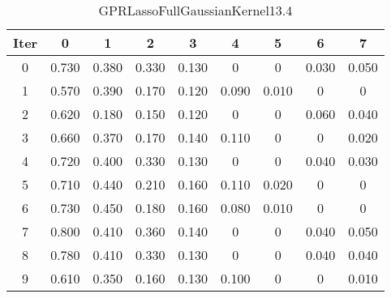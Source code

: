 \begin{table}
	\begin{center}
		\begin{tabular}{|c|c|c|c|c|c|c|c|c|}
			\hline
			Iter & 0 & 1 & 2 & 3 & 4 & 5 & 6 & 7 \\
			\hline
			0 & 0.730 & 0.380 & 0.330 & 0.130 & 0 & 0 & 0.030 & 0.050 \\
			\hline
			1 & 0.570 & 0.390 & 0.170 & 0.120 & 0.090 & 0.010 & 0 & 0 \\
			\hline
			2 & 0.620 & 0.180 & 0.150 & 0.120 & 0 & 0 & 0.060 & 0.040 \\
			\hline
			3 & 0.660 & 0.370 & 0.170 & 0.140 & 0.110 & 0 & 0 & 0.020 \\
			\hline
			4 & 0.720 & 0.400 & 0.330 & 0.130 & 0 & 0 & 0.040 & 0.030 \\
			\hline
			5 & 0.710 & 0.440 & 0.210 & 0.160 & 0.110 & 0.020 & 0 & 0 \\
			\hline
			6 & 0.730 & 0.450 & 0.180 & 0.160 & 0.080 & 0.010 & 0 & 0 \\
			\hline
			7 & 0.800 & 0.410 & 0.360 & 0.140 & 0 & 0 & 0.040 & 0.050 \\
			\hline
			8 & 0.780 & 0.410 & 0.330 & 0.130 & 0 & 0 & 0.040 & 0.040 \\
			\hline
			9 & 0.610 & 0.350 & 0.160 & 0.130 & 0.100 & 0 & 0 & 0.010 \\
			\hline
		\end{tabular}
	\end{center}
	\caption{GPRLassoFullGaussianKernel13.4}
\end{table}